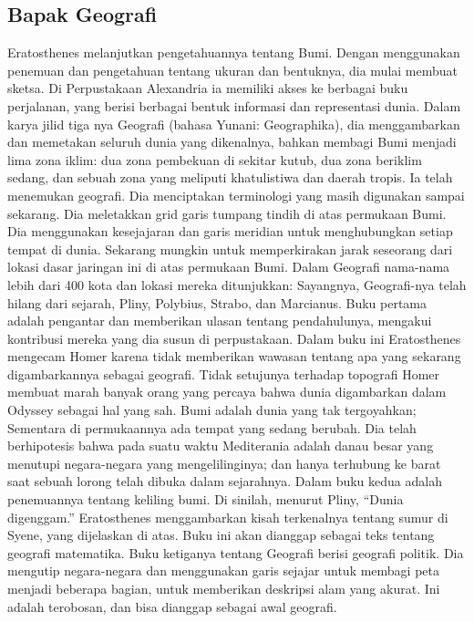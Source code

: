 \subsection{Bapak Geografi}
Eratosthenes melanjutkan pengetahuannya tentang Bumi. Dengan menggunakan penemuan dan pengetahuan tentang ukuran dan bentuknya, dia mulai membuat sketsa. Di Perpustakaan Alexandria ia memiliki akses ke berbagai buku perjalanan, yang berisi berbagai bentuk informasi dan representasi dunia. \cite{smith2005dictionary} Dalam karya jilid tiga nya Geografi (bahasa Yunani: Geographika), dia menggambarkan dan memetakan seluruh dunia yang dikenalnya, bahkan membagi Bumi menjadi lima zona iklim: \cite{grimbly2013encyclopedia} dua zona pembekuan di sekitar kutub, dua zona beriklim sedang, dan sebuah zona yang meliputi khatulistiwa dan daerah tropis. Ia telah menemukan geografi. Dia menciptakan terminologi yang masih digunakan sampai sekarang. Dia meletakkan grid garis tumpang tindih di atas permukaan Bumi. Dia menggunakan kesejajaran dan garis meridian untuk menghubungkan setiap tempat di dunia. Sekarang mungkin untuk memperkirakan jarak seseorang dari lokasi dasar jaringan ini di atas permukaan Bumi. Dalam Geografi nama-nama lebih dari 400 kota dan lokasi mereka ditunjukkan:  Sayangnya, Geografi-nya telah hilang dari sejarah, Pliny, Polybius, Strabo, dan Marcianus. \cite{roller2010eratosthenes}
Buku pertama adalah pengantar dan memberikan ulasan tentang pendahulunya, mengakui kontribusi mereka yang dia susun di perpustakaan. Dalam buku ini Eratosthenes mengecam Homer karena tidak memberikan wawasan tentang apa yang sekarang digambarkannya sebagai geografi. Tidak setujunya terhadap topografi Homer membuat marah banyak orang yang percaya bahwa dunia digambarkan dalam Odyssey sebagai hal yang sah. \cite{eckerman2011eratosthenes} Bumi adalah dunia yang tak tergoyahkan; Sementara di permukaannya ada tempat yang sedang berubah. Dia telah berhipotesis bahwa pada suatu waktu Mediterania adalah danau besar yang menutupi negara-negara yang mengelilinginya; dan hanya terhubung ke barat saat sebuah lorong telah dibuka dalam sejarahnya.
Dalam buku kedua adalah penemuannya tentang keliling bumi. Di sinilah, menurut Pliny, ``Dunia digenggam.'' Eratosthenes menggambarkan kisah terkenalnya tentang sumur di Syene, yang dijelaskan di atas. Buku ini akan dianggap sebagai teks tentang geografi matematika.
Buku ketiganya tentang Geografi berisi geografi politik. Dia mengutip negara-negara dan menggunakan garis sejajar untuk membagi peta menjadi beberapa bagian, untuk memberikan deskripsi alam yang akurat. Ini adalah terobosan, dan bisa dianggap sebagai awal geografi. \cite{smith2005dictionary}

